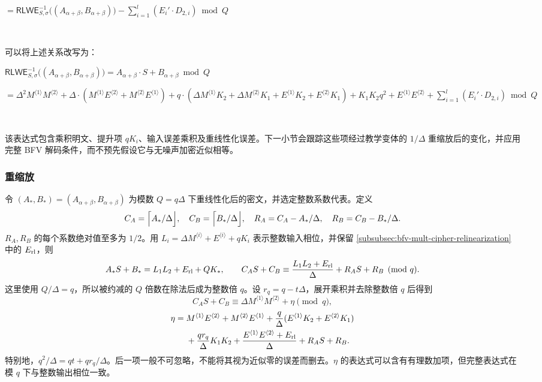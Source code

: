 $= \textsf{RLWE}_{S, \sigma}^{-1}\bm((A_{\alpha+\beta}, B_{\alpha+\beta})\bm) - \sum\limits_{i=1}^{l} (E_i'\cdot D_{2,i}) \bmod Q$  

$ $

可以将上述关系改写为：


$\textsf{RLWE}_{S, \sigma}^{-1}\bm((A_{\alpha+\beta}, B_{\alpha+\beta})\bm) = A_{\alpha+\beta}\cdot S + B_{\alpha+\beta} \bmod Q$

$ = \Delta^2M^{\langle 1 \rangle}M^{\langle 2 \rangle} + \Delta\cdot (M^{\langle 1 \rangle}E^{\langle 2 \rangle} + M^{\langle 2 \rangle}E^{\langle 1 \rangle}) + q\cdot(\Delta M^{\langle 1 \rangle}K_2 + \Delta M^{\langle 2 \rangle}K_1 + E^{\langle 1 \rangle}K_2 + E^{\langle 2 \rangle}K_1) + K_1 K_2 q^2 + E^{\langle 1 \rangle} E^{\langle 2 \rangle} + \sum\limits_{i=1}^{l} (E_i'\cdot D_{2,i}) \bmod Q$ 

$ $

该表达式包含乘积明文、提升项 $qK_i$、输入误差乘积及重线性化误差。下一小节会跟踪这些项经过教学变体的 $1/\Delta$ 重缩放后的变化，并应用完整 BFV 解码条件，而不预先假设它与无噪声加密近似相等。


\subsubsection{重缩放}
\label{subsubsec:bfv-mult-cipher-rescaling}

令 $(A_*,B_*)=(A_{\alpha+\beta},B_{\alpha+\beta})$ 为模数 $Q=q\Delta$ 下重线性化后的密文，并选定整数系数代表。定义
\[
C_A=\Bigl\lceil A_*/\Delta\Bigr\rfloor,\quad C_B=\Bigl\lceil B_*/\Delta\Bigr\rfloor,
\quad R_A=C_A-A_*/\Delta,\quad R_B=C_B-B_*/\Delta.
\]
$R_A,R_B$ 的每个系数绝对值至多为 $1/2$。用 $L_i=\Delta M^{\langle i\rangle}+E^{\langle i\rangle}+qK_i$ 表示整数输入相位，并保留 \autoref{subsubsec:bfv-mult-cipher-relinearization} 中的 $E_{\rm rl}$，则
\[
A_*S+B_*=L_1L_2+E_{\rm rl}+QK_*,
\qquad C_AS+C_B\equiv\frac{L_1L_2+E_{\rm rl}}{\Delta}+R_AS+R_B\pmod q.
\]
这里使用 $Q/\Delta=q$，所以被约减的 $Q$ 倍数在除法后成为整数倍 $q$。设 $r_q=q-t\Delta$，展开乘积并去除整数倍 $q$ 后得到
\[
C_AS+C_B\equiv\Delta M^{\langle1\rangle}M^{\langle2\rangle}+\eta\pmod q,
\]
\[
\begin{split}
\eta={}&M^{\langle1\rangle}E^{\langle2\rangle}+M^{\langle2\rangle}E^{\langle1\rangle}
+\frac q\Delta(E^{\langle1\rangle}K_2+E^{\langle2\rangle}K_1)\\
&+\frac{q r_q}{\Delta}K_1K_2
+\frac{E^{\langle1\rangle}E^{\langle2\rangle}+E_{\rm rl}}{\Delta}+R_AS+R_B.
\end{split}
\]
特别地，$q^2/\Delta=qt+q r_q/\Delta$。后一项一般不可忽略，不能将其视为近似零的误差而删去。$\eta$ 的表达式可以含有有理数加项，但完整表达式在模 $q$ 下与整数输出相位一致。

